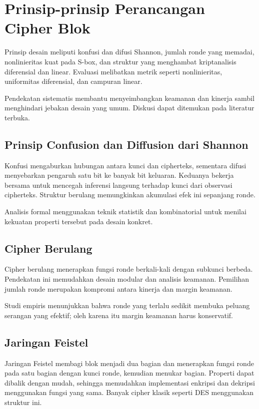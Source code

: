 \documentclass[../main.tex]{subfiles}
\begin{document}
\section{Prinsip-prinsip Perancangan Cipher Blok}
Prinsip desain meliputi konfusi dan difusi Shannon, jumlah ronde yang memadai, nonlinieritas kuat pada S-box, dan struktur yang menghambat kriptanalisis diferensial dan linear. Evaluasi melibatkan metrik seperti nonlinieritas, uniformitas diferensial, dan campuran linear.

Pendekatan sistematis membantu menyeimbangkan keamanan dan kinerja sambil menghindari jebakan desain yang umum. Diskusi dapat ditemukan pada literatur terbuka.

\subsection{Prinsip Confusion dan Diffusion dari Shannon}
Konfusi mengaburkan hubungan antara kunci dan cipherteks, sementara difusi menyebarkan pengaruh satu bit ke banyak bit keluaran. Keduanya bekerja bersama untuk mencegah inferensi langsung terhadap kunci dari observasi cipherteks. Struktur berulang memungkinkan akumulasi efek ini sepanjang ronde.

Analisis formal menggunakan teknik statistik dan kombinatorial untuk menilai kekuatan properti tersebut pada desain konkret.

\subsection{Cipher Berulang}
Cipher berulang menerapkan fungsi ronde berkali-kali dengan subkunci berbeda. Pendekatan ini memudahkan desain modular dan analisis keamanan. Pemilihan jumlah ronde merupakan kompromi antara kinerja dan margin keamanan.

Studi empiris menunjukkan bahwa ronde yang terlalu sedikit membuka peluang serangan yang efektif; oleh karena itu margin keamanan harus konservatif.

\subsection{Jaringan Feistel}
Jaringan Feistel membagi blok menjadi dua bagian dan menerapkan fungsi ronde pada satu bagian dengan kunci ronde, kemudian menukar bagian. Properti dapat dibalik dengan mudah, sehingga memudahkan implementasi enkripsi dan dekripsi menggunakan fungsi yang sama. Banyak cipher klasik seperti DES menggunakan struktur ini.
\end{document}
